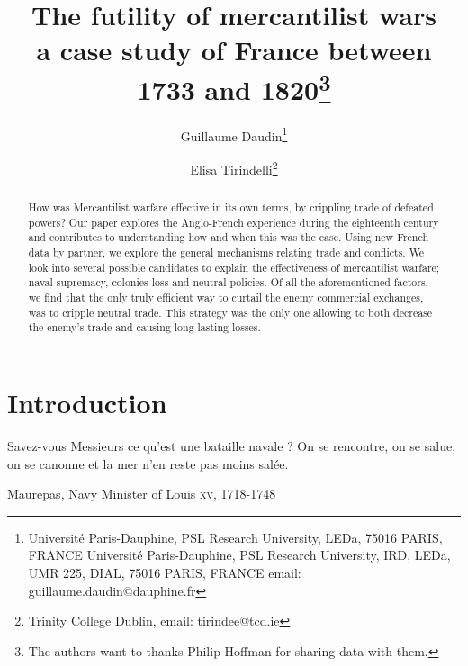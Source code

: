 \documentclass[12pt,a4paper,notitlepage,english]{article}
\author{
  Guillaume Daudin\thanks{Université Paris-Dauphine, PSL Research University, LEDa, 75016 PARIS, FRANCE Université Paris-Dauphine, PSL Research University, IRD, LEDa, UMR 225, DIAL, 75016 PARIS, FRANCE email: guillaume.daudin@dauphine.fr}
  \and
  Elisa Tirindelli\thanks{Trinity College Dublin, email: tirindee@tcd.ie}
}
\title{The futility of mercantilist wars \\ a case study of France between 1733 and 1820\thanks{The authors want to thanks Philip Hoffman for sharing data with them.}}
\date{}
\begin{document}
\maketitle


\begin{abstract}
How was Mercantilist warfare effective in its own terms, by crippling trade of defeated powers? Our paper explores the Anglo-French experience during the eighteenth century and contributes to understanding how and when this was the case. Using new French data by partner, we explore the general mechanisms relating trade and conflicts. We look into several possible candidates to explain the effectiveness of mercantilist warfare; naval supremacy, colonies loss and neutral policies. Of all the aforementioned factors, we find that the only truly efficient way to curtail the enemy commercial exchanges, was to cripple neutral trade. This strategy was the only one allowing to both decrease the enemy's trade and causing long-lasting losses.
\end{abstract}


\section{Introduction} \label{introduction}

\epigraph{Savez-vous Messieurs ce qu’est une bataille navale ? On se rencontre, on se salue, on se canonne et la mer n’en reste pas moins salée.}{Maurepas, Navy Minister of Louis  \textsc{xv}, 1718-1748}



\maketitle
\end{document}
